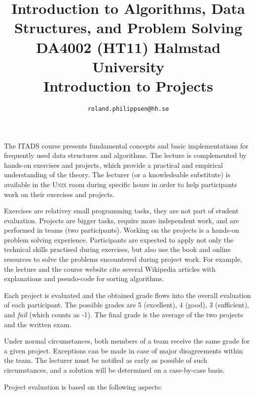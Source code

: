 \documentclass[a4paper,10pt]{article}
\begin{document}
\title{
  {\normalsize
    Introduction to Algorithms, Data Structures, and Problem Solving\\
    DA4002 (HT11) Halmstad University}\\
  Introduction to Projects
}
\author{
  \texttt{roland.philippsen@hh.se}
}
\maketitle

The ITADS course presents fundamental concepts and basic implementations for frequently used data structures and algorithms.
The lecture is complemented by hands-on exercises and projects, which provide a practical and empirical understanding of the theory.
The lecturer (or a knowledeable substitute) is available in the \textsc{Unix} room during specific hours in order to help participants work on their exercises and projects.

Exercises are relativey small programming tasks, they are not part of student evaluation.
Projects are bigger tasks, require more independent work, and are performed in teams (two participants).
Working on the projects is a hands-on problem solving experience.
Participants are expected to apply not only the technical skills practised during exercises, but also use the book and online resources to solve the problems encountered during project work.
For example, the lecture and the course website cite several Wikipedia articles with explanations and pseudo-code for sorting algorithms.

Each project is evaluated and the obtained grade flows into the overall evaluation of each participant.
The possible grades are 5 (excellent), 4 (good), 3 (sufficient), and \emph{fail} (which counts as -1).
The final grade is the average of the two projects and the written exam.

Under normal circumstances, both members of a team receive the same grade for a given project.
Exceptions can be made in case of major disagreements within the team.
The lecturer must be notified as early as possible of such circumstances, and a solution will be determined on a case-by-case basis.

Project evaluation is based on the following aspects:
\end{document}

